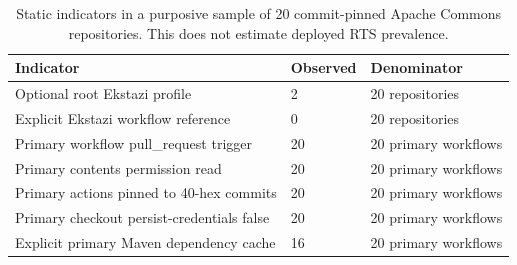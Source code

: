 \begin{table}[t]
\centering
\small
\caption{Static indicators in a purposive sample of 20 commit-pinned Apache Commons repositories. This does not estimate deployed RTS prevalence.}
\label{tab:static-audit}
\begin{tabular}{lll}
\toprule
Indicator & Observed & Denominator \\
\midrule
Optional root Ekstazi profile & 2 & 20 repositories \\
Explicit Ekstazi workflow reference & 0 & 20 repositories \\
Primary workflow pull\_request trigger & 20 & 20 primary workflows \\
Primary contents permission read & 20 & 20 primary workflows \\
Primary actions pinned to 40-hex commits & 20 & 20 primary workflows \\
Primary checkout persist-credentials false & 20 & 20 primary workflows \\
Explicit primary Maven dependency cache & 16 & 20 primary workflows \\
\bottomrule
\end{tabular}
\end{table}
